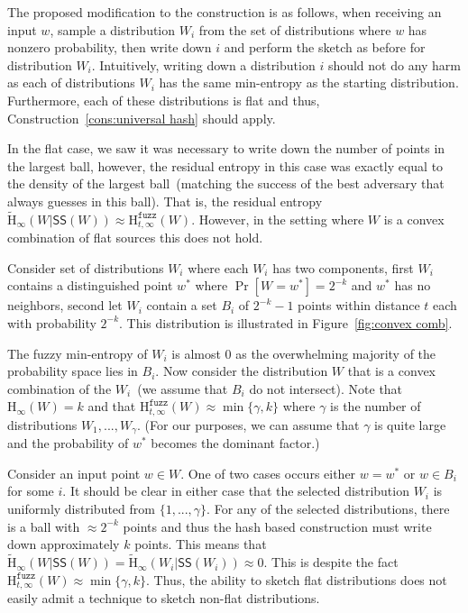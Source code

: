 \documentclass[11pt]{article}
\newcommand{\consref}[1]{\mbox{Construction~\ref{#1}}}
\newcommand{\figref}[1]{\mbox{Figure~\ref{#1}}}
\newcommand{\class}[1]{{\ensuremath{\mathsf{#1}}}}
\newcommand{\sketch}{\ensuremath{\class{SS}}\xspace}
\newcommand{\Hoo}{\mathrm{H}_\infty}
\newcommand{\Hav}{\tilde{\mathrm{H}}_\infty}
\newcommand{\Hfuzz}{\mathrm{H}^{\mathtt{fuzz}}_{t,\infty}}
\begin{document}
The proposed modification to the construction is as follows, when receiving an input $w$, sample a distribution $W_i$ from the set of distributions where $w$ has nonzero probability, then write down $i$ and perform the sketch as before for distribution $W_i$.  Intuitively, writing down a distribution $i$ should not do any harm as each of distributions $W_i$ has the same min-entropy as the starting distribution.  Furthermore, each of these distributions is flat and thus, \consref{cons:universal hash} should apply.

In the flat case, we saw it was necessary to write down the number of points in the largest ball, however, the residual entropy in this case was exactly equal to the density of the largest ball~(matching the success of the best adversary that always guesses in this ball).  That is, the residual entropy $\Hav(W|\sketch(W)) \approx \Hfuzz(W)$.  However, in the setting where $W$ is a convex combination of flat sources this does not hold.

Consider set of distributions $W_i$ where each $W_i$ has two components, first $W_i$ contains a distinguished point $w^*$ where $\Pr[W=w^*] = 2^{-k}$ and $w^*$ has no neighbors, second let $W_i$ contain a set $B_i$ of $2^{-k}-1$ points within distance $t$ each with probability $2^{-k}$.  This distribution is illustrated in \figref{fig:convex comb}.  

The fuzzy min-entropy of $W_i$ is almost $0$ as the overwhelming majority of the probability space lies in $B_i$.  Now consider the distribution $W$ that is a convex combination of the $W_i$~(we assume that $B_i$ do not intersect).  Note that $\Hoo(W)=k$ and that $\Hfuzz(W)\approx \min\{\gamma, k\}$ where $\gamma$ is the number of distributions $W_1,..., W_\gamma$.  (For our purposes, we can assume that $\gamma$ is quite large and the probability of $w^*$ becomes the dominant factor.)

Consider an input point $w\in W$.  One of two cases occurs either $w=w^*$ or $w\in B_i$ for some $i$.  It should be clear in either case that the selected distribution $W_i$ is uniformly distributed from $\{1,..., \gamma\}$.  For any of the selected distributions, there is a ball with $\approx 2^{-k}$ points and thus the hash based construction must write down approximately $k$ points.  This means that $\Hav(W | \sketch(W))  = \Hav(W_i | \sketch(W_i)) \approx 0$.  This is despite the fact $\Hfuzz(W) \approx \min\{\gamma, k\}$.  Thus, the ability to sketch flat distributions does not easily admit a technique to sketch non-flat distributions.  
\end{document}

